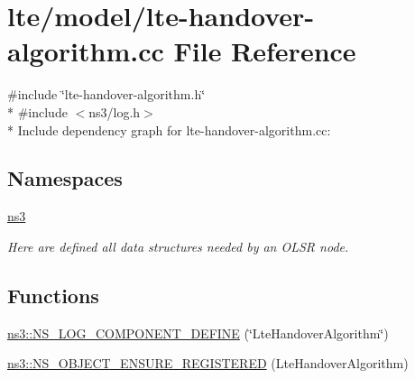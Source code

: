 \hypertarget{lte-handover-algorithm_8cc}{}\section{lte/model/lte-\/handover-\/algorithm.cc File Reference}
\label{lte-handover-algorithm_8cc}
{\ttfamily \#include \char`\"{}lte-\/handover-\/algorithm.\+h\char`\"{}}\\*
{\ttfamily \#include $<$ns3/log.\+h$>$}\\*
Include dependency graph for lte-\/handover-\/algorithm.cc\+:
\subsection*{Namespaces}
\begin{DoxyCompactItemize}
\item 
 \hyperlink{namespacens3}{ns3}
\begin{DoxyCompactList}\small\item\em Here are defined all data structures needed by an O\+L\+SR node. \end{DoxyCompactList}\end{DoxyCompactItemize}
\subsection*{Functions}
\begin{DoxyCompactItemize}
\item 
\hyperlink{namespacens3_ac9d4614043ece4c3fd58ee0c5c54f195}{ns3\+::\+N\+S\+\_\+\+L\+O\+G\+\_\+\+C\+O\+M\+P\+O\+N\+E\+N\+T\+\_\+\+D\+E\+F\+I\+NE} (\char`\"{}Lte\+Handover\+Algorithm\char`\"{})
\item 
\hyperlink{namespacens3_ac65abde11f850db59040fc70e480d346}{ns3\+::\+N\+S\+\_\+\+O\+B\+J\+E\+C\+T\+\_\+\+E\+N\+S\+U\+R\+E\+\_\+\+R\+E\+G\+I\+S\+T\+E\+R\+ED} (Lte\+Handover\+Algorithm)
\end{DoxyCompactItemize}
